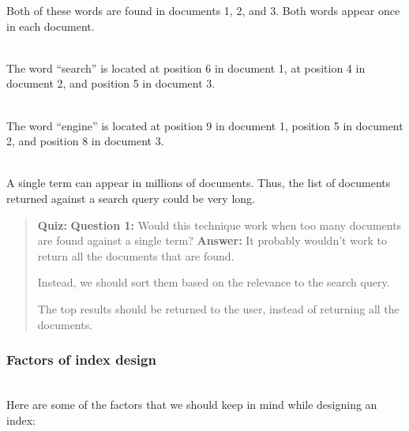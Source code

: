 Both of these words are found in documents 1, 2, and 3. Both words appear once in each document.\\
\strut \\
The word ``search'' is located at position 6 in document 1, at position 4 in document 2, and position 5 in document 3.\\
\strut \\
The word ``engine'' is located at position 9 in document 1, position 5 in document 2, and position 8 in document 3.\\
\strut \\
A single term can appear in millions of documents. Thus, the list of documents returned against a search query could be very long.\\

\begin{quote}
\textbf{Quiz:}
\textbf{Question 1:} Would this technique work when too many documents are found against a single term?
\textbf{Answer:} It probably wouldn't work to return all the documents that are found.

Instead, we should sort them based on the relevance to the search query.

The top results should be returned to the user, instead of returning all the documents.
\end{quote}

\subsubsection{Factors of index design}\label{uXYV98S-tk8kGFLiaOOvl}
\\
Here are some of the factors that we should keep in mind while designing an index:

